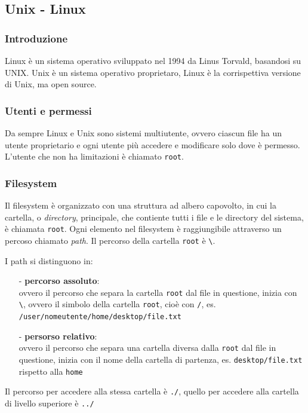 \documentclass{article}
\begin{document}
\newpage


\subsection{Unix - Linux}
\subsubsection*{Introduzione}
Linux è un sistema operativo sviluppato nel 1994 da Linus Torvald, basandosi su UNIX.
Unix è un sistema operativo proprietaro, Linux è la corrispettiva versione di Unix, ma open source.

\subsubsection*{Utenti e permessi}
Da sempre Linux e Unix sono sistemi multiutente, ovvero ciascun file ha un utente proprietario e ogni utente più accedere
e modificare solo dove è permesso. L'utente che non ha limitazioni è chiamato \verb|root|.

\subsubsection*{Filesystem}
Il filesystem è organizzato con una struttura ad albero capovolto, in cui la cartella, o \textit{directory}, principale,
che contiente tutti i file e le directory del sistema, è chiamata \verb|root|. Ogni elemento nel filesystem è raggiungibile
attraverso un percoso chiamato \textit{path}. Il percorso della cartella \verb|root| è \verb|\|.

I path si distinguono in:
\begin{itemize} [topsep=3pt, itemsep=0pt]
	\item[-] \textbf{percorso assoluto}: \\
	ovvero il percorso che separa la cartella \verb|root| dal file in questione, inizia con \verb|\|, ovvero il simbolo della
	cartella \verb|root|, cioè con \verb|/|, es. \verb|/user/nomeutente/home/desktop/file.txt|
	\item[-] \textbf{persorso relativo}: \\
	ovvero il percorso che separa una cartella diversa dalla \verb|root| dal file in questione, inizia con il nome della cartella
	di partenza, es. \verb|desktop/file.txt| rispetto alla \verb|home|
\end{itemize}
Il percorso per accedere alla stessa cartella è \verb|./|, quello per accedere alla cartella di livello superiore è \verb|../|
\end{document}
